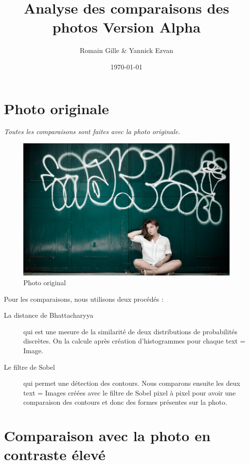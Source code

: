 \documentclass[]{article}
\title{Analyse des comparaisons des photos Version Alpha}
\author{Romain Gille \& Yannick Ezvan}
\date{\today}
\begin{document}
\maketitle

{
\hypersetup{linkcolor=black}
\setcounter{tocdepth}{3}
\tableofcontents
}

\newpage

\section{Photo originale}\label{photo-originale}

\emph{Toutes les comparaisons sont faites avec la photo originale.}

\begin{figure}[htbp]
\centering
\includegraphics{photos/original.jpg}
\caption{Photo original}
\end{figure}

Pour les comparaisons, nous utilisons deux procédés :

\begin{description}
\item[La distance de Bhattacharyya] qui est une mesure de la similarité de deux
  distributions de probabilités discrètes. On la calcule après création
  d'histogrammes pour chaque text = Image.
\item[Le filtre de Sobel] qui permet une détection des contours. Nous comparons
  ensuite les deux text = Images créées avec le filtre de Sobel pixel à pixel pour
  avoir une comparaison des contours et donc des formes présentes sur la photo.
\end{description}

\newpage

\section{Comparaison avec la photo en contraste
élevé}\label{comparaison-avec-la-photo-en-contraste-uxe9levuxe9}
\end{document}
